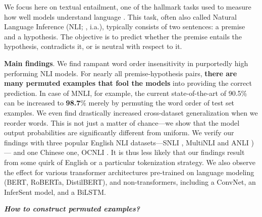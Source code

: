 \documentclass[12pt]{article}
\newcommand{\xhdr}[1]{{\noindent\bfseries #1}.}
\newcommand{\xit}[1]{{\noindent\textbf{\textit{#1}}}}
\begin{document}
We focus here on textual entailment, one of the hallmark tasks used to measure how well models understand language \cite{condoravdi-etal-2003-entailment, dagan-etal-2005-pascal}. This task, often also called Natural Language Inference (NLI; \cite{bowman-etal-2015-large}, i.a.), typically consists of two sentences: a premise and a hypothesis. The objective is to predict whether the premise entails the hypothesis, contradicts it, or is neutral with respect to it.

\xhdr{Main findings} We find rampant word order insensitivity in purportedly high performing NLI models. For nearly all premise-hypothesis pairs, \textbf{there are many permuted examples that fool the models} into providing the correct prediction. In case of MNLI, for example, the current state-of-the-art of 90.5\% can be increased to \textbf{98.7}\% merely by permuting the word order of test set examples. We even find drastically increased cross-dataset generalization when we reorder words. This is not just a matter of chance---we show that the model output probabilities are significantly different from uniform.
We verify our findings with three popular English NLI datasets---SNLI \citep{bowman-etal-2015-large}, MultiNLI \citep{williams-etal-2018-broad} and ANLI \citep{nie-etal-2020-adversarial})---
and one Chinese one, OCNLI \cite{hu-etal-2020-ocnli}. It is thus less likely that our findings result from some quirk of English or a particular tokenization strategy.
We also observe the effect for various transformer architectures pre-trained on language modeling (BERT, RoBERTa, DistilBERT), and non-transformers, including a ConvNet, an InferSent model, and a BiLSTM.

\xit{How to construct permuted examples?}
\end{document}
